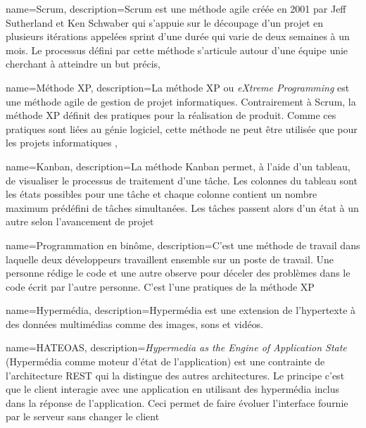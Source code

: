 \documentclass[a4paper,12pt,dvipsnames]{report}
\begin{document}




\tableofcontents
\listoffigures
\listoftables














{
	name={Scrum},
	description={Scrum est une méthode agile créée en 2001 par Jeff Sutherland et Ken Schwaber qui s'appuie sur le découpage d'un projet en plusieurs itérations appelées sprint d'une durée qui varie de deux semaines à un mois. Le processus défini par cette méthode s'articule autour d'une équipe unie cherchant à atteindre un but précis},
}

{
	name={M\'ethode XP},
	description={La méthode XP ou \textit{eXtreme Programming} est une méthode agile de gestion de projet informatiques. Contrairement à Scrum, la méthode XP définit des pratiques pour la réalisation de produit. Comme ces pratiques sont liées au génie logiciel, cette méthode ne peut être utilisée que pour les projets informatiques },
}

{
	name={Kanban},
	description={La méthode Kanban permet, à l'aide d'un tableau, de visualiser le processus de traitement d'une tâche. Les colonnes du tableau sont les états possibles pour une tâche et chaque colonne contient un nombre maximum prédéfini de tâches simultanées. Les tâches passent alors d'un état à un autre selon l'avancement de projet}
}

{
	name={Programmation en binôme},
	description={C'est une méthode de travail dans laquelle deux développeurs travaillent ensemble sur un poste de travail. Une personne rédige le code et une autre observe pour déceler des problèmes dans le code écrit par l'autre personne. C'est l'une pratiques de la méthode XP}
}

{
	name={Hyperm\'edia},
	description={Hypermédia est une extension de l'hypertexte à des données multimédias comme des images, sons et vidéos.}
}

{
	name={HATEOAS},
	description={\textit{Hypermedia as the Engine of Application State} (Hypermédia comme moteur d'état de l'application) est une contrainte de l'architecture REST qui la distingue des autres architectures. Le principe c'est que le client interagie avec une application en utilisant des hypermédia inclus dans la réponse de l'application. Ceci permet de faire évoluer l'interface fournie par le serveur sans changer le client}  
}
\end{document}
